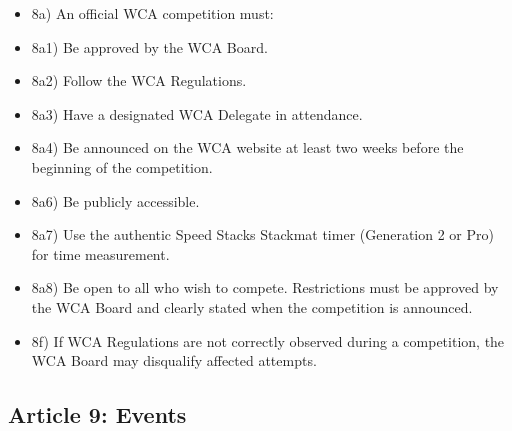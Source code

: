\begin{itemize}
\item
  8a) An official WCA competition must:
\item
  8a1) Be approved by the WCA Board.
\item
  8a2) Follow the WCA Regulations.
\item
  8a3) Have a designated WCA Delegate in attendance.
\item
  8a4) Be announced on the WCA website at least two weeks before the
  beginning of the competition.
\item
  8a6) Be publicly accessible.
\item
  8a7) Use the authentic Speed Stacks Stackmat timer (Generation 2 or
  Pro) for time measurement.
\item
  8a8) Be open to all who wish to compete. Restrictions must be approved
  by the WCA Board and clearly stated when the competition is announced.
\item
  8f) If WCA Regulations are not correctly observed during a
  competition, the WCA Board may disqualify affected attempts.
\end{itemize}

\subsection{ Article 9: Events}

